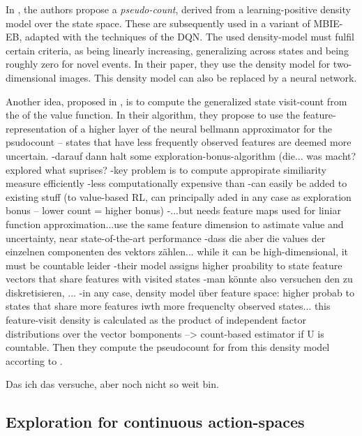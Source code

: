 In \cite{bellemare_unifying_2016}, the authors propose a \textit{pseudo-count}, derived from a learning-positive density model over the state space. These are subsequently used in a variant of MBIE-EB, adapted with the techniques of the DQN. The used density-model must fulfil certain criteria, as being linearly increasing, generalizing across states and being roughly zero for novel events. In their paper, they use the  density model for two-dimensional images. This density model can also be replaced by a neural network.

Another idea, proposed in \cite{martin_count-based_2017}, is to compute the generalized state visit-count from the  of the value function. In their algorithm, they propose to use the feature-representation of a higher layer of the neural bellmann approximator for the psudocount -- states that have less frequently observed features are deemed more uncertain. 
-darauf dann halt some exploration-bonus-algorithm (die... was macht? explored what suprises?
-key problem is to compute appropirate similiarity measure efficiently
-less computationally expensive than \cite{bellemare_unifying_2016}
-can easily be added to existing stuff (to value-based RL, can principally aded in any case as exploration bonus -- lower count = higher bonus)
-...but needs feature maps used for liniar function approximation...use the same feature dimension to astimate value and uncertainty, near state-of-the-art performance
-dass die aber die values der einzelnen componenten des vektors zählen... while it can be high-dimensional, it must be countable leider
-their model assigns higher proability to state feature vectors that share features with visited states
-man könnte also versuchen den zu diskretisieren, ...
-in any case, density model über feature space: higher probab to states that share more features iwth more frequenclty observed states... this feature-visit density is calculated as the product of independent factor distributions over the vector bomponents --> count-based estimator if U is countable. Then they compute the pseudocount for from this density model accorting to \cite{bellemare_unifying_2016}.

Das ich das versuche, aber noch nicht so weit bin.

\subsection{Exploration for continuous action-spaces}

